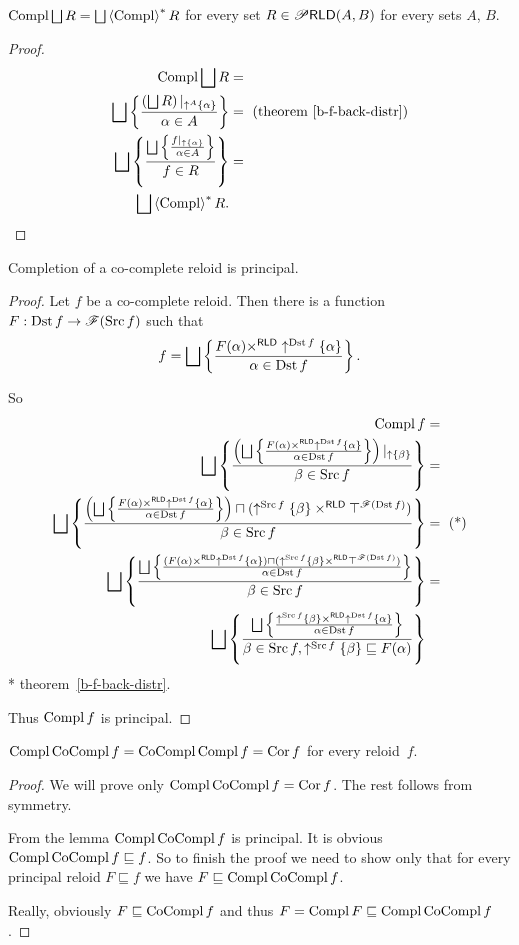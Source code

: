 \begin{thm}
$\Compl\bigsqcup R=\bigsqcup\rsupfun{\Compl}R$ for every set $R\in\mathscr{P}\mathsf{RLD}(A,B)$
for every sets $A$, $B$.\end{thm}
\begin{proof}
~
\begin{align*}
\Compl\bigsqcup R & =\\
\bigsqcup\setcond{\left(\bigsqcup R\right)|_{\uparrow^{A}\{\alpha\}}}{\alpha\in A} & =\text{ (theorem~\ref{b-f-back-distr})}\\
\bigsqcup\setcond{\bigsqcup\setcond{f|_{\uparrow \{\alpha\}}}{\alpha\in A}}{f\in R} & =\\
\bigsqcup\rsupfun{\Compl}R.
\end{align*}
\end{proof}
\begin{lem}
Completion of a co-complete reloid is principal.\end{lem}
\begin{proof}
Let $f$ be a co-complete reloid. Then there is a function $F:\operatorname{Dst} f\rightarrow\mathscr{F}(\operatorname{Src} f)$
such that
\[
f=\bigsqcup\setcond{F(\alpha)\times^{\mathsf{RLD}}\uparrow^{\Dst f}\{\alpha\}}{\alpha\in\Dst f}.
\]


So
\begin{align*}
\Compl f & =\\
\bigsqcup\setcond{\left(\bigsqcup\setcond{F(\alpha)\times^{\mathsf{RLD}}\uparrow^{\Dst f}\{\alpha\}}{\alpha\in\Dst f}\right)|_{\uparrow\{\beta\}}}{\beta\in\Src f} & =\\
\bigsqcup\setcond{\left(\bigsqcup\setcond{F(\alpha)\times^{\mathsf{RLD}}\uparrow^{\Dst f}\{\alpha\}}{\alpha\in\Dst f}\right)\sqcap(\uparrow^{\Src f}\{\beta\}\times^{\mathsf{RLD}}\top^{\mathscr{F}(\Dst f)})}{\beta\in\Src f} & =\text{ (*)}\\
\bigsqcup\setcond{\bigsqcup\setcond{(F(\alpha)\times^{\mathsf{RLD}}\uparrow^{\Dst f}\{\alpha\})\sqcap(\uparrow^{\Src f}\{\beta\}\times^{\mathsf{RLD}}\top^{\mathscr{F}(\Dst f)})}{\alpha\in\Dst f}}{\beta\in\Src f} & =\\
\bigsqcup\setcond{\bigsqcup\setcond{\uparrow^{\Src f}\{\beta\}\times^{\mathsf{RLD}}\uparrow^{\Dst f}\{\alpha\}}{\alpha\in\Dst f}}{\beta\in\Src f,\uparrow^{\Src f}\{\beta\}\sqsubseteq F(\alpha)}
\end{align*}
{*} theorem~\ref{b-f-back-distr}.

Thus $\operatorname{Compl} f$ is principal.\end{proof}
\begin{thm}
$\operatorname{Compl}\operatorname{CoCompl} f=\operatorname{CoCompl}\operatorname{Compl} f=\operatorname{Cor} f$ for every reloid~$f$.\end{thm}
\begin{proof}
We will prove only $\operatorname{Compl}\operatorname{CoCompl} f=\operatorname{Cor} f$. The rest follows from
symmetry.

From the lemma $\operatorname{Compl}\operatorname{CoCompl} f$ is principal. It is obvious $\operatorname{Compl}\operatorname{CoCompl} f\sqsubseteq f$.
So to finish the proof we need to show only that for every principal
reloid $F\sqsubseteq f$ we have $F\sqsubseteq\operatorname{Compl}\operatorname{CoCompl} f$.

Really, obviously $F\sqsubseteq\operatorname{CoCompl} f$ and thus $F=\operatorname{Compl} F\sqsubseteq\operatorname{Compl}\operatorname{CoCompl} f$.\end{proof}

